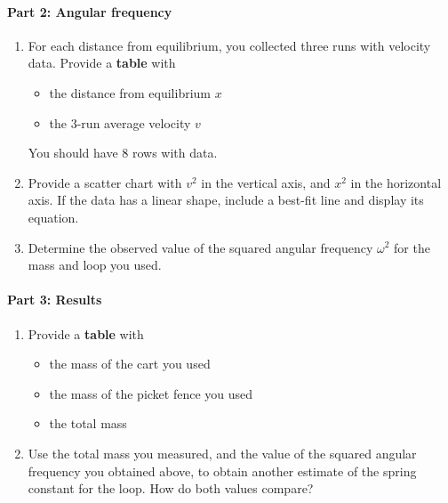 \paragraph{Part 2: Angular frequency}
%
\begin{enumerate}
    \item For each distance from equilibrium, you collected three runs with velocity data. Provide a \textbf{table} with
    \begin{itemize}
        \item the distance from equilibrium $x$
        \item the 3-run average velocity $v$
    \end{itemize}
    You should have 8 rows with data.
    \item Provide a scatter chart with $v^{2}$ in the vertical axis, and $x^{2}$ in the horizontal axis. If the data has a linear shape, include a best-fit line and display its equation.
    \item Determine the observed value of the squared angular frequency $\omega^{2}$ for the mass and loop you used.
\end{enumerate}
%
\paragraph{Part 3: Results}
%
\begin{enumerate}
    \item Provide a \textbf{table} with
    \begin{itemize}
        \item the mass of the cart you used
        \item the mass of the picket fence you used
        \item the total mass
    \end{itemize}
    \item Use the total mass you measured, and the value of the squared angular frequency you obtained above, to obtain another estimate of the spring constant for the loop. How do both values compare?
\end{enumerate}
%
\newpage
